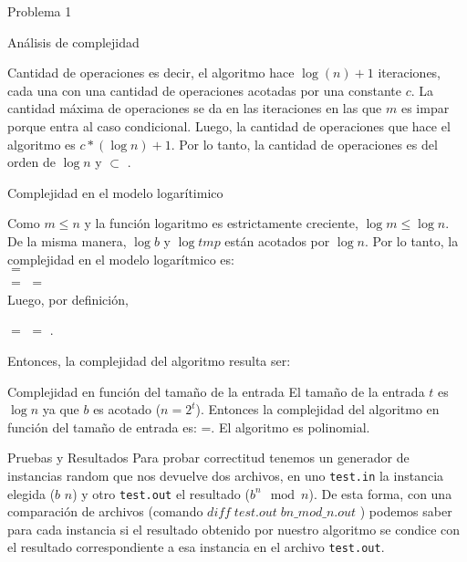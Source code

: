 \begin{section}{Problema 1}
\begin{subsection}{Análisis de complejidad}
\begin{subsubsection}{Cantidad de operaciones}
			\noindent es decir, el algoritmo hace $\log(n)+1$ iteraciones, cada una con una cantidad de operaciones acotadas por una constante $c$. La cantidad máxima de
			operaciones se da en las iteraciones en las que $m$ es impar porque entra al caso condicional. Luego, la cantidad de operaciones que hace el algoritmo es $c*(\log n)+1$.
			Por lo tanto, la cantidad de operaciones es del orden de $\log n$ y  $\subset$ .

		\end{subsubsection}


		\begin{subsubsection}{Complejidad en el modelo logarítimico}

			Como $m\leq n$ y la función logaritmo es estrictamente creciente, $\log m \leq \log n$. De la misma manera, $\log b$ y $\log tmp$ están acotados por $\log n$. Por lo tanto, la complejidad en el modelo logarítmico es: \\
			 $=$ \\
			$=$  $=$  \\

			Luego, por definición, 
			\begin{center}
				 $=$  $=$ .
			\end{center}

			Entonces, la complejidad del algoritmo resulta ser: \VSP
		
		\end{subsubsection}


		\begin{subsubsection}{Complejidad en función del tamaño de la entrada}
			El tamaño de la entrada $t$ es $\log n$ ya que $b$ es acotado ($n=2^t$). Entonces la complejidad del algoritmo en función del tamaño de entrada es: =. El algoritmo es polinomial.
		\end{subsubsection}

	\end{subsection}

	\begin{subsection}{Pruebas y Resultados}
		Para probar correctitud tenemos un generador de instancias random que nos devuelve dos archivos, en uno \texttt{test.in} la instancia elegida ($b$ $n$) y otro \texttt{test.out} el resultado ($b^n \mod n$). De esta forma, con una comparación de archivos (comando $diff\;test.out\;bn\_mod\_n.out$ ) podemos saber para cada instancia si el resultado obtenido por nuestro algoritmo se condice con el resultado correspondiente a esa instancia en el archivo \texttt{test.out}.
		

\end{subsection}
\end{section}
